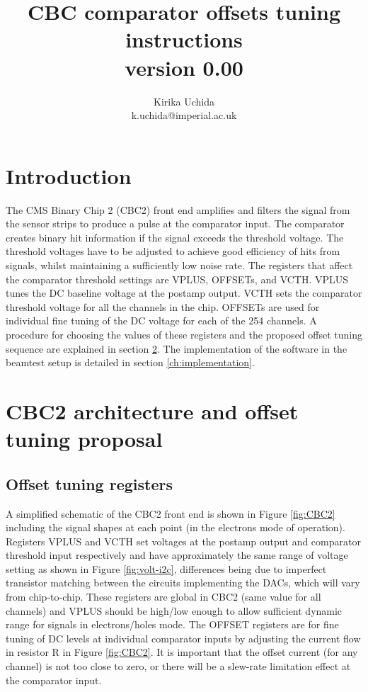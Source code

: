 \documentclass[11pt,a4paper]{article}
\begin{document}
\title{CBC comparator offsets tuning instructions \\ version 0.00}

\author{Kirika Uchida\\
	k.uchida@imperial.ac.uk}

	\maketitle
	\tableofcontents

	\section{Introduction}
	The CMS Binary Chip 2 (CBC2) front end amplifies and filters the signal from the sensor strips to produce a pulse at the comparator input. The comparator creates binary hit information if the signal exceeds the threshold voltage. 
	The threshold voltages have to be adjusted to achieve good efficiency of hits from signals, whilst maintaining a sufficiently low noise rate. 
	The registers that affect the comparator threshold settings are VPLUS, OFFSETs, and VCTH.  
	VPLUS tunes the DC baseline voltage at the postamp output. VCTH sets the comparator threshold voltage for all the channels in the chip.  
	OFFSETs are used for individual fine tuning of the DC voltage for each of the 254 channels. 
	A procedure for choosing the values of these registers and the 
	proposed offset tuning sequence are explained in section \ref{ch:architecture-proposal}. 
	The implementation of the software in the beamtest setup is detailed in section \ref{ch:implementation}.  

	\section{CBC2 architecture and offset tuning proposal}\label{ch:architecture-proposal}
	\subsection{Offset tuning registers}\label{sec:reg}
	A simplified schematic of the CBC2 front end is shown in Figure \ref{fig:CBC2} including the signal shapes at each point (in the electrons mode of operation).  
	Registers VPLUS and VCTH set voltages at the postamp output and comparator threshold input respectively and have approximately the same range of voltage setting
	as shown in Figure \ref{fig:volt-i2c}, differences being due to imperfect transistor matching between the circuits implementing the DACs, which will vary from chip-to-chip.
	These registers are global in CBC2 (same value for all channels) and VPLUS should be high/low enough to allow sufficient dynamic range for signals in electrons/holes mode.
	The OFFSET registers are for fine tuning of DC levels at individual comparator inputs by adjusting the current flow in resistor R in Figure \ref{fig:CBC2}. It is important that the offset current (for any channel) is
	not too close to zero, or there will be a slew-rate limitation effect at the comparator input.
\end{document}
